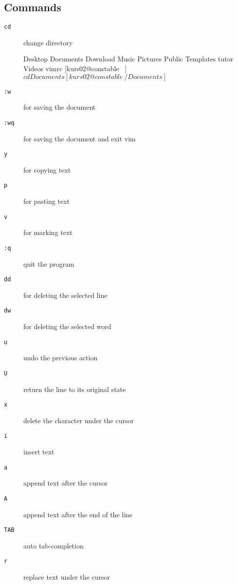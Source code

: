 \documentclass[10pt,a4paper]{scrartcl}
\begin{document}
\subsection{Commands}
\begin{description}

\item[\texttt{cd}]change directory
    \begin{terminalcode}
Desktop  Documents  Download  Music  Pictures  Public  Templates  tutor  Videos  vimrc
[kurs02@constable ~]$ cd Documents
[kurs02@constable ~/Documents]$ 
    \end{terminalcode}

\item[\texttt{:w}]for saving the document

\item[\texttt{:wq}]for saving the document and exit vim

\item[\texttt{y}]for copying text

\item[\texttt{p}]for pasting text

\item[\texttt{v}]for marking text

\item[\texttt{:q}]quit the program

\item[\texttt{dd}]for deleting the selected line

\item[\texttt{dw}]for deleting the selected word

\item[\texttt{u}]undo the previous action

\item[\texttt{U}]return the line to its original state

\item[\texttt{x}]delete the character under the cursor

\item[\texttt{i}]insert text

\item[\texttt{a}]append text after the cursor

\item[\texttt{A}]append text after the end of the line

\item[\texttt{TAB}]auto tab-completion

\item[\texttt{r}]replace text under the cursor


\end{description}
\end{document}
